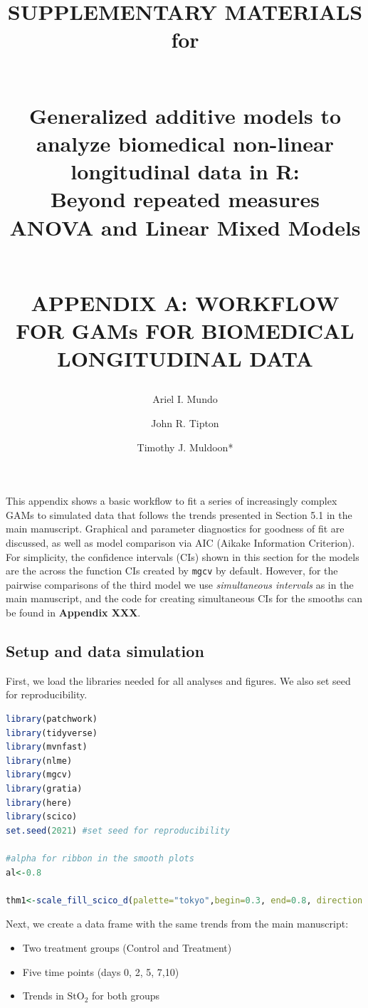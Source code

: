 \documentclass[
]{article}
\author{Ariel I. Mundo \orcidaffila{}}
\author{John R. Tipton \orcidaffilb{}}
\author{Timothy J. Muldoon*}
\affil{tmuldoon@uark.edu}
\title{SUPPLEMENTARY MATERIALS for\\
\strut \\
\textbf{Generalized additive models to analyze biomedical non-linear longitudinal data in R:}\\
Beyond repeated measures ANOVA and Linear Mixed Models\\
\strut \\
APPENDIX A: WORKFLOW FOR GAMs FOR BIOMEDICAL LONGITUDINAL DATA}
\author{}
\date{\vspace{-2.5em}}
\newcommand{\passthrough}[1]{#1}
\providecommand{\tightlist}{%
  \setlength{\itemsep}{0pt}\setlength{\parskip}{0pt}}
\begin{document}
\maketitle

\newpage


This appendix shows a basic workflow to fit a series of increasingly complex GAMs to simulated data that follows the trends presented in Section 5.1 in the main manuscript. Graphical and parameter diagnostics for goodness of fit are discussed, as well as model comparison via AIC (Aikake Information Criterion). For simplicity, the confidence intervals (CIs) shown in this section for the models are the across the function CIs created by \passthrough{\lstinline!mgcv!} by default. However, for the pairwise comparisons of the third model we use \emph{simultaneous intervals} as in the main manuscript, and the code for creating simultaneous CIs for the smooths can be found in \textbf{Appendix XXX}.

\hypertarget{setup-and-data-simulation}{%
\subsection{Setup and data simulation}\label{setup-and-data-simulation}}

First, we load the libraries needed for all analyses and figures. We also set seed for reproducibility.

\begin{lstlisting}[language=R]
library(patchwork)
library(tidyverse)
library(mvnfast)
library(nlme)
library(mgcv)
library(gratia)
library(here)
library(scico)
set.seed(2021) #set seed for reproducibility

#alpha for ribbon in the smooth plots
al<-0.8

thm1<-scale_fill_scico_d(palette="tokyo",begin=0.3, end=0.8, direction = -1, aesthetics = c("colour","fill"))
\end{lstlisting}

Next, we create a data frame with the same trends from the main manuscript:

\begin{itemize}
\tightlist
\item
  Two treatment groups (Control and Treatment)
\item
  Five time points (days 0, 2, 5, 7,10)
\item
  Trends in \(\mbox{StO}_2\) for both groups
\end{itemize}
\end{document}
